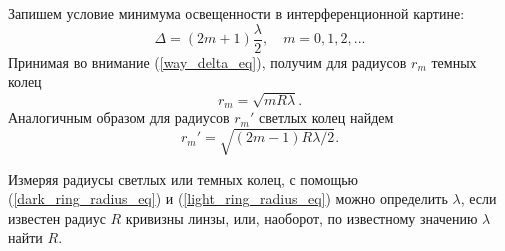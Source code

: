 \documentclass[a4paper, 12pt]{article}
\begin{document}
	Запишем условие минимума освещенности в интерференционной картине:
	\begin{equation}
		\Delta=\left(2m+1\right)\frac{\lambda}{2}, \quad m=0,1,2, ...
	\end{equation}
	Принимая во внимание (\ref{way_delta_eq}), получим для радиусов $r_m$ темных колец
	\begin{equation}
		r_m=\sqrt{mR\lambda}.
		\label{dark_ring_radius_eq}
	\end{equation}
	Аналогичным образом для радиусов $r_m'$ светлых колец найдем
	\begin{equation}
		r_m'=\sqrt{\left(2m-1\right)R\lambda/2}.
		\label{light_ring_radius_eq}
	\end{equation}
	\par
	Измеряя радиусы светлых или темных колец, с помощью (\ref{dark_ring_radius_eq}) и (\ref{light_ring_radius_eq}) можно определить $\lambda$, если известен радиус $R$ кривизны линзы, или, наоборот, по известному значению $\lambda$ найти $R$.
\end{document}
